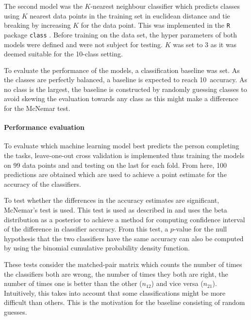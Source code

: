 \documentclass[11pt,fleqn]{article}
\begin{document}
The second model was the \(K\)-nearest neighbour classifier which predicts classes using \(K\) nearest data points in the training set in euclidean distance and tie breaking by increasing \(K\) for the data point. This was implemented in the \texttt{R} package \texttt{class} \cite{KNN}. Before training on the data set, the hyper parameters of both models were defined and were not subject for testing. \(K\) was set to 3 as it was deemed suitable for the 10-class setting.

To evaluate the performance of the models, a classification baseline was set. As the classes are perfectly balanced, a baseline is expected to reach 10\pro\ accuracy. As no class is the largest, the baseline is constructed by randomly guessing classes to avoid skewing the evaluation towards any class as this might make a difference for the McNemar test.


\paragraph{Performance evaluation}
To evaluate which machine learning model best predicts the person completing the tasks, leave-one-out cross validation is implemented thus training the models on 99 data points and and testing on the last for each fold.
From here, 100 predictions are obtained which are used to achieve a point estimate for the accuracy of the classifiers.

To test whether the differences in the accuracy estimates are significant, McNemar's test is used. 
This test is used as described in \cite[Method 11.3.2]{Tue} and uses the beta distribution as a posterior to achieve a method for computing confidence interval of the difference in classifier accuracy.
From this test, a \(p\)-value for the null hypothesis that the two classifiers have the same accuracy can also be computed by using the binomial cumulative probability density function.

These tests consider the matched-pair matrix which counts the number of times the classifiers both are wrong, the number of times they both are right, the number of times one is better than the other (\(n_{12}\)) and vice versa (\(n_{21}\)).
Intuitively, this takes into account that some classifications might be more difficult than others. 
This is the motivation for the baseline consisting of random guesses.
\end{document}
